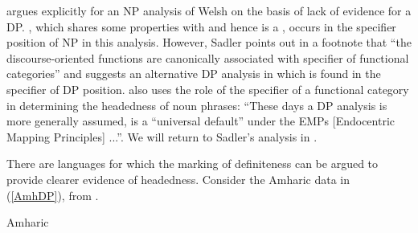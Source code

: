 \documentclass[output=paper,hidelinks]{langscibook}
\begin{document}
\citet[92]{Sadler00} argues explicitly for an NP analysis of Welsh on the basis of lack of evidence for a DP. {\POSS}, which shares some properties with {\SUBJ} and hence is a {\DF}, occurs in the specifier position of NP in this analysis. However, Sadler points out in a footnote that ``the discourse-oriented functions are canonically associated with specifier of functional categories'' \citeyearpar[97]{Sadler00} and suggests an alternative DP analysis in which {\POSS} is found in the specifier of DP position. \citet[211]{Charters14} also uses the role of the specifier of a functional category in determining the headedness of noun phrases: ``These days a DP analysis is more generally assumed, is a ``universal default'' under the EMPs [Endocentric Mapping Principles] ...''. We will return to Sadler's analysis in .


There are languages for which the marking of definiteness can be argued to provide clearer evidence of headedness. Consider the Amharic data in (\ref{AmhDP}), from \citet[197--199]{Kramer10}.

\eal\label{AmhDP} Amharic
\zl
\end{document}
